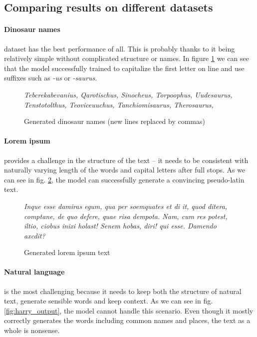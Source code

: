 \documentclass[11pt]{article}
\begin{document}
		\subsection{Comparing results on different datasets}
			\paragraph{Dinosaur names} dataset has the best performance of all. This is probably thanks to it being relatively simple without complicated structure or names. In figure \ref{fig:dinos_output} we can see that the model successfully trained to capitalize the first letter on line and use suffixes such as \textit{-us} or \textit{-saurus}.
			
			\begin{figure}[h]
				\centering
				\textit{
					Tebcrekabevanius,
					Qarotischus,
					Sinocheus,
					Torpoophus,
					Uudesaurus,
					Tenstotolthus,
					Teoviceuuchus,
					Tanchiomisaurus,
					Therosaurus,
				}
				
				\caption{Generated dinosaur names (new lines replaced by commas)}
				\label{fig:dinos_output}
			\end{figure}
		
		
			\paragraph{Lorem ipsum} provides a challenge in the structure of the text -- it needs to be consistent with naturally varying length of the words and capital letters after full stops.  As we can see in fig. \ref{fig:lipsum_output}, the model can successfully generate a convincing pseudo-latin text.
			
			\begin{figure}[h]
				\centering
				
				\textit{
					Inque esse damiras egum, qua per soemquates et di it, quod ditera, comptane, de quo defere, quae risa dempota. Nam, cum res potest, iltio, ciobus inixi holast! Senem hobas, diri! qui esse. Damendo axcdit?
				}
				
				\caption{Generated lorem ipsum text}
				\label{fig:lipsum_output}
			\end{figure}
		
			\paragraph{Natural language} is the most challenging because it needs to keep both the structure of natural text, generate sensible words and keep context. As we can see in fig. \ref{fig:harry_output}, the model cannot handle this scenario. Even though it mostly correctly generates the words including common names and places, the text as a whole is nonsense.
			
\end{document}
